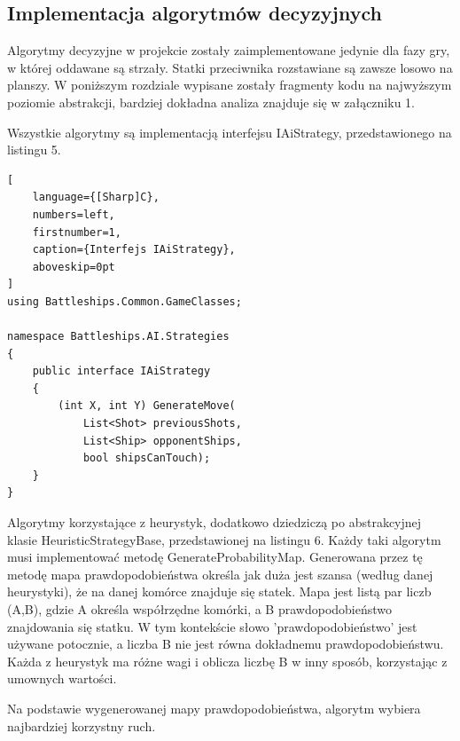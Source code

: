 \subsection{Implementacja algorytmów decyzyjnych}
\indent Algorytmy decyzyjne w projekcie zostały zaimplementowane jedynie dla fazy gry, w której oddawane są strzały. Statki przeciwnika rozstawiane są zawsze losowo na planszy. W poniższym rozdziale wypisane zostały fragmenty kodu na najwyższym poziomie abstrakcji, bardziej dokładna analiza znajduje się w załączniku 1.

Wszystkie algorytmy są implementacją interfejsu IAiStrategy, przedstawionego na listingu 5.

\begin{addmargin}[10mm]{0mm}
\begin{lstlisting}[
    language={[Sharp]C},
    numbers=left,
    firstnumber=1,
    caption={Interfejs IAiStrategy},
    aboveskip=0pt
]
using Battleships.Common.GameClasses;

namespace Battleships.AI.Strategies
{
    public interface IAiStrategy
    {
        (int X, int Y) GenerateMove(
            List<Shot> previousShots,
            List<Ship> opponentShips,
            bool shipsCanTouch);
    }
}
\end{lstlisting}
\end{addmargin}

Algorytmy korzystające z heurystyk, dodatkowo dziedziczą po abstrakcyjnej klasie HeuristicStrategyBase, przedstawionej na listingu 6. Każdy taki algorytm musi implementować metodę GenerateProbabilityMap. Generowana przez tę metodę mapa prawdopodobieństwa określa jak duża jest szansa (według danej heurystyki), że na danej komórce znajduje się statek. Mapa jest listą par liczb (A,B), gdzie A określa współrzędne komórki, a B prawdopodobieństwo znajdowania się statku. W tym kontekście słowo 'prawdopodobieństwo' jest używane potocznie, a liczba B nie jest równa dokładnemu prawdopodobieństwu. Każda z heurystyk ma różne wagi i oblicza liczbę B w inny sposób, korzystając z umownych wartości.

\indent Na podstawie wygenerowanej mapy prawdopodobieństwa, algorytm wybiera najbardziej korzystny ruch. 

